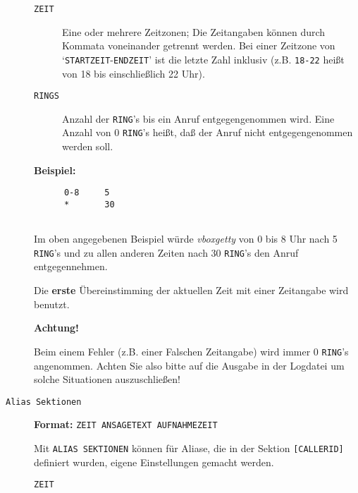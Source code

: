 \begin{description}
\begin{description}


\item[{\tt ZEIT}] \mbox{}



Eine oder mehrere Zeitzonen; Die Zeitangaben k\"{o}nnen durch Kommata
voneinander getrennt werden. Bei einer Zeitzone von
`{\tt STARTZEIT}-{\tt ENDZEIT}' ist die letzte Zahl inklusiv
(z.B. {\tt 18-22} hei{\ss}t von 18 bis einschlie{\ss}lich 22 Uhr).



\item[{\tt RINGS}] \mbox{}



Anzahl der {\tt RING}'s bis ein Anruf entgegengenommen wird. Eine
Anzahl von 0 {\tt RING}'s hei{\ss}t, da{\ss} der Anruf nicht
entgegengenommen werden soll.



\end{description}


{\bf Beispiel:}

\begin{verbatim}
      0-8     5 
      *       30
   
\end{verbatim}


Im oben angegebenen Beispiel w\"{u}rde {\em vboxgetty\/} von 0 bis 8 Uhr nach
5 {\tt RING}'s und zu allen anderen Zeiten nach 30 {\tt RING}'s den
Anruf entgegennehmen.

Die {\bf erste} \"{U}bereinstimming der aktuellen Zeit mit einer
Zeitangabe wird benutzt.

{\bf Achtung!}

Beim einem Fehler (z.B. einer Falschen Zeitangabe) wird immer 0
{\tt RING}'s angenommen. Achten Sie also bitte auf die Ausgabe in der
Logdatei um solche Situationen auszuschlie{\ss}en!



\item[{\tt Alias Sektionen}] \mbox{}



{\bf Format:} {\tt ZEIT ANSAGETEXT AUFNAHMEZEIT}

Mit {\tt ALIAS SEKTIONEN} k\"{o}nnen f\"{u}r Aliase, die in der Sektion
{\tt [CALLERID]} definiert wurden, eigene Einstellungen gemacht
werden.

\begin{description}


\item[{\tt ZEIT}] \mbox{}




\end{description}
\end{description}
